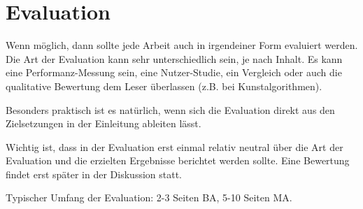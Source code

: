 \chapter{Evaluation}

Wenn möglich, dann sollte jede Arbeit auch in irgendeiner Form evaluiert werden. Die Art der Evaluation kann sehr unterschiedlich sein, je nach Inhalt. Es kann eine Performanz-Messung sein, eine Nutzer-Studie, ein Vergleich oder auch die qualitative Bewertung dem Leser überlassen (z.B. bei Kunstalgorithmen).

Besonders praktisch ist es natürlich, wenn sich die Evaluation direkt aus den Zielsetzungen in der Einleitung ableiten lässt.

Wichtig ist, dass in der Evaluation erst einmal relativ neutral über die Art der Evaluation und die erzielten Ergebnisse berichtet werden sollte. Eine Bewertung findet erst später in der Diskussion statt.

Typischer Umfang der Evaluation: 2-3 Seiten BA, 5-10 Seiten MA.
